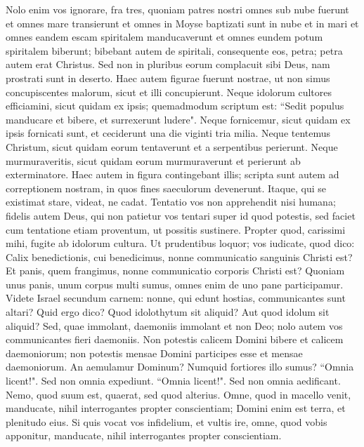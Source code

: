 \begin{biblechapter} 
\verse Nolo enim vos ignorare, fra tres, quoniam patres nostri omnes sub nube fuerunt et omnes mare transierunt 
\verse et omnes in Moyse baptizati sunt in nube et in mari 
\verse et omnes eandem escam spiritalem manducaverunt 
\verse et omnes eundem potum spiritalem biberunt; bibebant autem de spiritali, consequente eos, petra; petra autem erat Christus. 
\verse Sed non in pluribus eorum complacuit sibi Deus, nam prostrati sunt in deserto. 
\verse Haec autem figurae fuerunt nostrae, ut non simus concupiscentes malorum, sicut et illi concupierunt. 
\verse Neque idolorum cultores efficiamini, sicut quidam ex ipsis; quemadmodum scriptum est: “Sedit populus manducare et bibere, et surrexerunt ludere". 
\verse Neque fornicemur, sicut quidam ex ipsis fornicati sunt, et ceciderunt una die viginti tria milia. 
\verse Neque tentemus Christum, sicut quidam eorum tentaverunt et a serpentibus perierunt. 
\verse Neque murmuraveritis, sicut quidam eorum murmuraverunt et perierunt ab exterminatore.  
\verse Haec autem in figura contingebant illis; scripta sunt autem ad correptionem nostram, in quos fines saeculorum devenerunt. 
\verse Itaque, qui se existimat stare, videat, ne cadat. 
\verse Tentatio vos non apprehendit nisi humana; fidelis autem Deus, qui non patietur vos tentari super id quod potestis, sed faciet cum tentatione etiam proventum, ut possitis sustinere. 
\verse Propter quod, carissimi mihi, fugite ab idolorum cultura. 
\verse Ut prudentibus loquor; vos iudicate, quod dico: 
\verse Calix benedictionis, cui benedicimus, nonne communicatio sanguinis Christi est? Et panis, quem frangimus, nonne communicatio corporis Christi est? 
\verse Quoniam unus panis, unum corpus multi sumus, omnes enim de uno pane participamur. 
\verse Videte Israel secundum carnem: nonne, qui edunt hostias, communicantes sunt altari? 
\verse Quid ergo dico? Quod idolothytum sit aliquid? Aut quod idolum sit aliquid?  
\verse Sed, quae immolant, daemoniis immolant et non Deo; nolo autem vos communicantes fieri daemoniis. 
\verse Non potestis calicem Domini bibere et calicem daemoniorum; non potestis mensae Domini participes esse et mensae daemoniorum. 
\verse An aemulamur Dominum? Numquid fortiores illo sumus? 
\verse “Omnia licent!". Sed non omnia expediunt. “Omnia licent!". Sed non omnia aedificant. 
\verse Nemo, quod suum est, quaerat, sed quod alterius. 
\verse Omne, quod in macello venit, manducate, nihil interrogantes propter conscientiam;  
\verse Domini enim est terra, et plenitudo eius. 
\verse Si quis vocat vos infidelium, et vultis ire, omne, quod vobis apponitur, manducate, nihil interrogantes propter conscientiam. 

\end{biblechapter}
